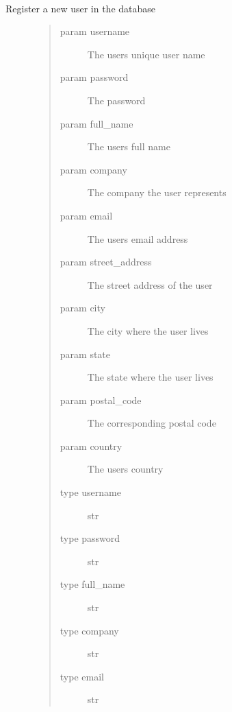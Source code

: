 \documentclass[letterpaper,10pt,english]{sphinxmanual}
\begin{document}
\begin{fulllineitems}
\label{\detokenize{index:models.register.set_user}}~\begin{description}
\item[{Register a new user in the database}] \leavevmode\begin{quote}\begin{description}
\item[{param username}] \leavevmode
The users unique user name

\item[{param password}] \leavevmode
The password

\item[{param full\_name}] \leavevmode
The users full name

\item[{param company}] \leavevmode
The company the user represents

\item[{param email}] \leavevmode
The users email address

\item[{param street\_address}] \leavevmode
The street address of the user

\item[{param city}] \leavevmode
The city where the user lives

\item[{param state}] \leavevmode
The state where the user lives

\item[{param postal\_code}] \leavevmode
The corresponding postal code

\item[{param country}] \leavevmode
The users country

\item[{type username}] \leavevmode
str

\item[{type password}] \leavevmode
str

\item[{type full\_name}] \leavevmode
str

\item[{type company}] \leavevmode
str

\item[{type email}] \leavevmode
str


\end{description}
\end{quote}
\end{description}
\end{fulllineitems}
\end{document}
